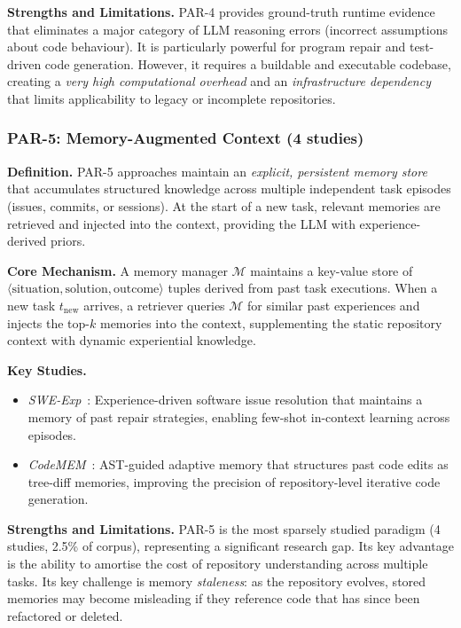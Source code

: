 \documentclass[acmsmall,screen,review]{acmart}
\begin{document}
\textbf{Strengths and Limitations.}
PAR-4 provides ground-truth runtime evidence that eliminates a major
category of LLM reasoning errors (incorrect assumptions about code
behaviour). It is particularly powerful for program repair and
test-driven code generation. However, it requires a buildable and
executable codebase, creating a \emph{very high computational overhead}
and an \emph{infrastructure dependency} that limits applicability to
legacy or incomplete repositories.

\subsubsection{PAR-5: Memory-Augmented Context (4 studies)}
\label{subsubsec:par5}

\textbf{Definition.} PAR-5 approaches maintain an \emph{explicit,
persistent memory store} that accumulates structured knowledge across
multiple independent task episodes (issues, commits, or sessions). At
the start of a new task, relevant memories are retrieved and injected
into the context, providing the LLM with experience-derived priors.

\textbf{Core Mechanism.} A memory manager $\mathcal{M}$ maintains a
key-value store of $\langle \text{situation}, \text{solution},
\text{outcome} \rangle$ tuples derived from past task executions. When
a new task $t_{\text{new}}$ arrives, a retriever queries $\mathcal{M}$
for similar past experiences and injects the top-$k$ memories into the
context, supplementing the static repository context with dynamic
experiential knowledge.

\textbf{Key Studies.}
\begin{itemize}
  \item \textit{SWE-Exp}~\cite{Chen2025SWEExp}: Experience-driven
    software issue resolution that maintains a memory of past repair
    strategies, enabling few-shot in-context learning across episodes.
  \item \textit{CodeMEM}~\cite{Wang2026CodeMEM}: AST-guided adaptive
    memory that structures past code edits as tree-diff memories,
    improving the precision of repository-level iterative code
    generation.
\end{itemize}

\textbf{Strengths and Limitations.}
PAR-5 is the most sparsely studied paradigm (4 studies, 2.5\% of
corpus), representing a significant research gap. Its key advantage
is the ability to amortise the cost of repository understanding across
multiple tasks. Its key challenge is memory \emph{staleness}: as the
repository evolves, stored memories may become misleading if they
reference code that has since been refactored or deleted.
\end{document}
